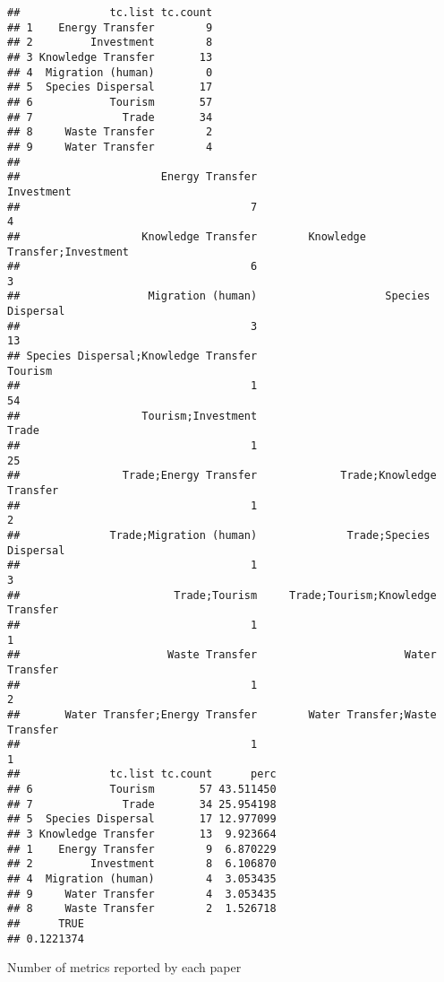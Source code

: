 \documentclass[
]{article}
\begin{document}
\begin{verbatim}
##              tc.list tc.count
## 1    Energy Transfer        9
## 2         Investment        8
## 3 Knowledge Transfer       13
## 4  Migration (human)        0
## 5  Species Dispersal       17
## 6            Tourism       57
## 7              Trade       34
## 8     Waste Transfer        2
## 9     Water Transfer        4
## 
##                      Energy Transfer                           Investment 
##                                    7                                    4 
##                   Knowledge Transfer        Knowledge Transfer;Investment 
##                                    6                                    3 
##                    Migration (human)                    Species Dispersal 
##                                    3                                   13 
## Species Dispersal;Knowledge Transfer                              Tourism 
##                                    1                                   54 
##                   Tourism;Investment                                Trade 
##                                    1                                   25 
##                Trade;Energy Transfer             Trade;Knowledge Transfer 
##                                    1                                    2 
##              Trade;Migration (human)              Trade;Species Dispersal 
##                                    1                                    3 
##                        Trade;Tourism     Trade;Tourism;Knowledge Transfer 
##                                    1                                    1 
##                       Waste Transfer                       Water Transfer 
##                                    1                                    2 
##       Water Transfer;Energy Transfer        Water Transfer;Waste Transfer 
##                                    1                                    1 
##              tc.list tc.count      perc
## 6            Tourism       57 43.511450
## 7              Trade       34 25.954198
## 5  Species Dispersal       17 12.977099
## 3 Knowledge Transfer       13  9.923664
## 1    Energy Transfer        9  6.870229
## 2         Investment        8  6.106870
## 4  Migration (human)        4  3.053435
## 9     Water Transfer        4  3.053435
## 8     Waste Transfer        2  1.526718
##      TRUE 
## 0.1221374
\end{verbatim}

Number of metrics reported by each paper
\end{document}

